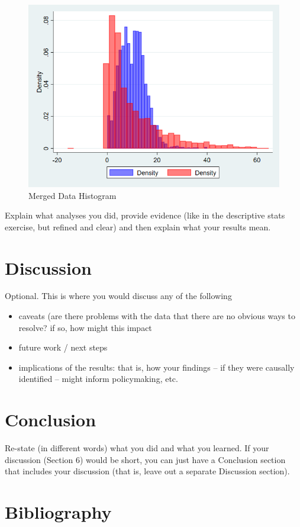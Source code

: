 \documentclass[12pt]{article}
\begin{document}
\begin{figure}
    \centering
    \includegraphics[width=0.5\linewidth]{.github/mergedhistogram.png}
    \caption{Merged Data Histogram}
    \label{fig:enter-label}
\end{figure}




Explain what analyses you did, provide evidence (like in the descriptive stats exercise, but refined and clear) and then explain what your results mean.




\section{Discussion}
\label{sec:discussion}

Optional. This is where you would discuss any of the following
\begin{itemize}
    \item caveats (are there problems with the data that there are no obvious ways to resolve? if so, how might this impact
    \item future work / next steps
    \item implications of the results: that is, how your findings -- if they were causally identified -- might inform policymaking, etc.
\end{itemize}

\section{Conclusion}
\label{sec:conclusion}

Re-state (in different words) what you did and what you learned. If your discussion (Section 6) would be short, you can just have a Conclusion section that includes your discussion (that is, leave out a separate Discussion section).

\newpage
\section*{Bibliography}
\singlespacing
\setlength\bibsep{0pt}
\end{document}
